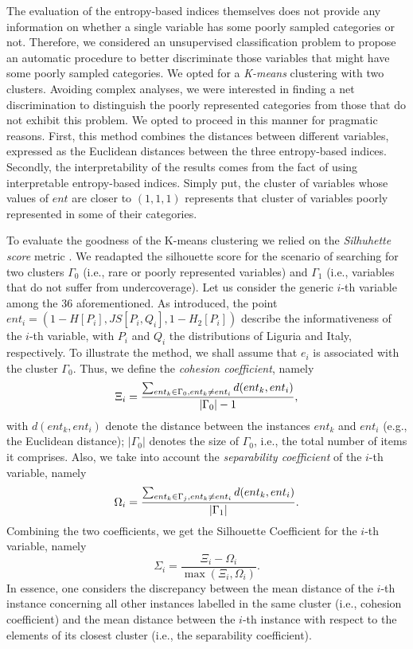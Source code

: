 The evaluation of the entropy-based indices themselves does not provide any information on whether a single variable has some poorly sampled categories or not.
Therefore, we considered an unsupervised classification problem to propose an automatic procedure to better discriminate those variables that might have some poorly sampled categories.
We opted for a \emph{K-means} clustering with two clusters. 
Avoiding complex analyses, we were interested in finding a net discrimination to distinguish the poorly represented categories from those that do not exhibit this problem.
We opted to proceed in this manner for pragmatic reasons.
First, this method combines the distances between different variables, expressed as the Euclidean distances between the three entropy-based indices. 
Secondly, the interpretability of the results comes from the fact of using interpretable entropy-based indices.
Simply put, the cluster of variables whose values of $ent$ are closer to $(1,1,1)$ represents that cluster of variables poorly represented in some of their categories.

To evaluate the goodness of the K-means clustering we relied on the \emph{Silhuhette score} metric \cite[]{rousseeuw1987silhouettes}.
We readapted the silhouette score for the scenario of searching for two clusters $\Gamma_{0}$ (i.e., rare or poorly represented variables) and $\Gamma_{1}$ (i.e., variables that do not suffer from undercoverage).
Let us consider the generic $i$-th variable among the 36 aforementioned.
As introduced, the point $ent_{i} = (1-H[P_i],JS[P_i,Q_i], 1-H_2[P_i] )$ describe the informativeness of the $i$-th variable, with $P_i$ and $Q_i$ the distributions of Liguria and Italy, respectively. 
To illustrate the method, we shall assume that $e_i$ is associated with the cluster $\Gamma_{0}$.
Thus, we define the \emph{cohesion coefficient}, namely
\begin{equation}
    \notag
    \Xi_{i} = \frac{\sum_{ent_{k} \in \Gamma_0, ent_{k} \neq ent_{i}}d({ent}_k, {ent}_i)}{|\Gamma_0|-1}, 
\end{equation}
with $d({ent}_k, {ent}_i)$ denote the distance between the instances ${ent}_k$ and ${ent}_i$ (e.g., the Euclidean distance); $|\Gamma_0|$ denotes the size of $\Gamma_0$, i.e., the total number of items it comprises.
Also, we take into account the \emph{separability coefficient} of the $i$-th variable, namely  
\begin{equation}
    \notag
    \Omega_{i} = \frac{\sum_{{ent}_k \in \Gamma_j, {ent}_k \neq {ent}_i}d({ent}_k, {ent}_i)}{|\Gamma_1|}.
\end{equation}
Combining the two coefficients, we get the  Silhouette Coefficient for the $i$-th variable, namely
\begin{equation}
    \label{def::Silhouette_Coefficient}
    \Sigma_{i} = \frac{\Xi_i-\Omega_i}{\max{(\Xi_i, \Omega_i)}}.
\end{equation}
In essence, one considers the discrepancy between the mean distance of the $i$-th instance concerning all other instances labelled in the same cluster (i.e., cohesion coefficient) and the mean distance between the $i$-th instance with respect to the elements of its closest cluster (i.e., the separability coefficient).


